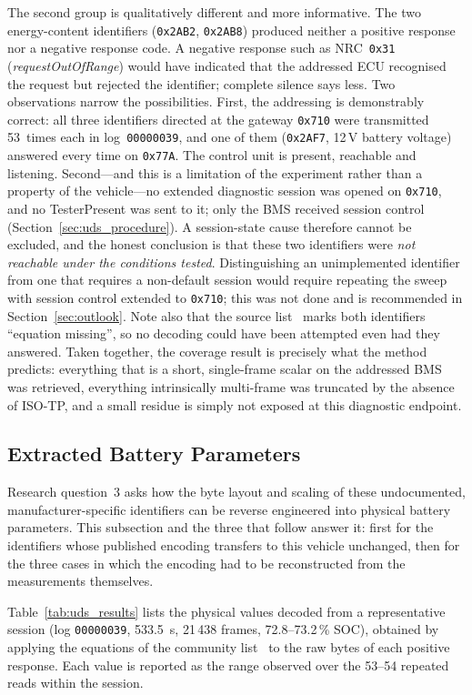 \documentclass[11pt,a4paper,oneside,parskip=half]{scrreprt}
\providecommand{\hex}{}\renewcommand{\hex}[1]{\texttt{0x#1}}
\begin{document}
The second group is qualitatively different and more informative. The two energy-content identifiers (\hex{2AB2}, \hex{2AB8}) produced neither a positive response nor a negative response code. A negative response such as NRC~\hex{31} (\emph{requestOutOfRange}) would have indicated that the addressed ECU recognised the request but rejected the identifier; complete silence says less. Two observations narrow the possibilities. First, the addressing is demonstrably correct: all three identifiers directed at the gateway \hex{710} were transmitted 53~times each in log~\texttt{00000039}, and one of them (\hex{2AF7}, 12\,V battery voltage) answered every time on \hex{77A}. The control unit is present, reachable and listening. Second---and this is a limitation of the experiment rather than a property of the vehicle---no extended diagnostic session was opened on \hex{710}, and no TesterPresent was sent to it; only the BMS received session control (Section~\ref{sec:uds_procedure}). A session-state cause therefore cannot be excluded, and the honest conclusion is that these two identifiers were \emph{not reachable under the conditions tested}. Distinguishing an unimplemented identifier from one that requires a non-default session would require repeating the sweep with session control extended to \hex{710}; this was not done and is recommended in Section~\ref{sec:outlook}. Note also that the source list~\cite{vwmebpidlist} marks both identifiers ``equation missing'', so no decoding could have been attempted even had they answered. Taken together, the coverage result is precisely what the method predicts: everything that is a short, single-frame scalar on the addressed BMS was retrieved, everything intrinsically multi-frame was truncated by the absence of ISO-TP, and a small residue is simply not exposed at this diagnostic endpoint.

\subsection{Extracted Battery Parameters}
Research question~3 asks how the byte layout and scaling of these undocumented, manufacturer-specific identifiers can be reverse engineered into physical battery parameters. This subsection and the three that follow answer it: first for the identifiers whose published encoding transfers to this vehicle unchanged, then for the three cases in which the encoding had to be reconstructed from the measurements themselves.

Table~\ref{tab:uds_results} lists the physical values decoded from a representative session (log \texttt{00000039}, 533.5~s, 21\,438 frames, 72.8--73.2\,\% SOC), obtained by applying the equations of the community list~\cite{vwmebpidlist} to the raw bytes of each positive response. Each value is reported as the range observed over the 53--54 repeated reads within the session.
\end{document}
